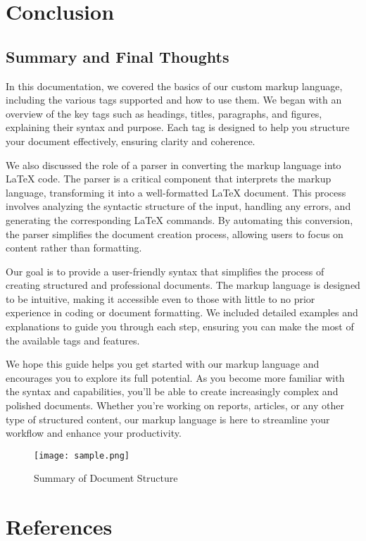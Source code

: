\documentclass[oneside]{book}
\begin{document}
\newpage
\chapter{Conclusion}
\section{Summary and Final Thoughts}
In this documentation, we covered the basics of our custom markup language, including the various tags supported and how to use them. We began with an overview
            of the key tags such as headings, titles, paragraphs, and figures, explaining their syntax and purpose. Each tag is designed to help you structure your document
            effectively, ensuring clarity and coherence.\par
We also discussed the role of a parser in converting the markup language into LaTeX code. The parser is a critical component that interprets the markup language,
            transforming it into a well-formatted LaTeX document. This process involves analyzing the syntactic structure of the input, handling any errors, and generating 
            the corresponding LaTeX commands. By automating this conversion, the parser simplifies the document creation process, allowing users to focus on content rather than formatting.\par
Our goal is to provide a user-friendly syntax that simplifies the process of creating structured and professional documents. The markup language is designed to be intuitive, making it accessible even to those with little to no prior experience in coding or document formatting. We included detailed examples and explanations to guide you through each step, ensuring you can make the most of the available tags and features.\par
We hope this guide helps you get started with our markup language and encourages you to explore its full potential. As you become more familiar with the syntax and capabilities, you'll be able to create increasingly complex and polished documents. Whether you're working on reports, articles, or any other type of structured content, our markup language is here to streamline your workflow and enhance your productivity.\par
\begin{figure}[h]
\centering
\texttt{[image: sample.png]}
\caption{Summary of Document Structure}
\end{figure}
\newpage
\chapter{References}
\end{document}
